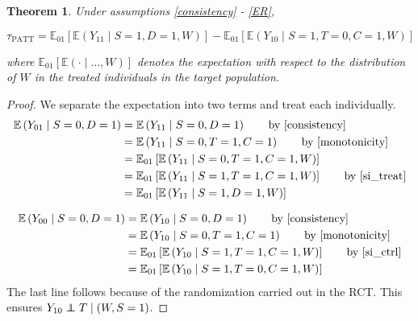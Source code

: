 \documentclass[12pt]{article}
\newtheorem{theorem}{Theorem}
\newcommand{\ex}{\mathbb{E}} %
\newcommand\independent{\protect\mathpalette{\protect\independenT}{\perp}}
\def\independenT#1#2{\mathrel{\rlap{$#1#2$}\mkern2mu{#1#2}}}
\begin{document}
\begin{theorem}\label{thm1}
Under assumptions \eqref{consistency} - \eqref{ER},

$$\tau_{\text{PATT}} = \ex_{01}\left[  \ex\left(Y_{11} \mid S=1, D=1, W\right)\right]
-\ex_{01}\left[  \ex\left(Y_{10} \mid S=1, T=0, C=1, W\right) \right] $$

where $\ex_{01}\left[\ex(\cdot \mid\dots, W)\right]$ denotes the expectation with respect to the distribution of $W$ in the treated individuals in the target population.  
\end{theorem}





\begin{proof}
We separate the expectation into two terms and treat each individually.
\begin{align*}
\ex\left(Y_{01} \mid S=0,D=1\right) &= \ex\left(Y_{11} \mid S=0, D=1\right) \tag*{by \eqref{consistency}} \\
&= \ex\left(Y_{11} \mid S=0, T=1, C=1\right) \tag*{by \eqref{monotonicity}} \\
&= \ex_{01}\left[  \ex\left(Y_{11} \mid S=0, T=1, C=1, W\right) \right] \\
&= \ex_{01}\left[  \ex\left(Y_{11} \mid S=1, T=1, C=1, W\right) \right] \tag*{by \eqref{si_treat}} \\
&= \ex_{01}\left[  \ex\left(Y_{11} \mid S=1, D=1, W\right)\right]
\end{align*}


\begin{align*}
\ex\left(Y_{00} \mid S=0, D=1\right) &= \ex\left(Y_{10} \mid S=0, D=1\right) \tag*{by \eqref{consistency}} \\
&= \ex\left(Y_{10} \mid S=0, T=1, C=1\right) \tag*{by \eqref{monotonicity}} \\
&= \ex_{01}\left[  \ex\left(Y_{10} \mid S=1, T=1, C=1, W\right) \right] \tag*{by \eqref{si_ctrl}} \\
&= \ex_{01}\left[  \ex\left(Y_{10} \mid S=1, T=0, C=1, W\right) \right] \\
\end{align*}
The last line follows because of the randomization carried out in the RCT.  This ensures $Y_{10} \independent T \mid (W, S=1)$.
\end{proof}
\end{document}
